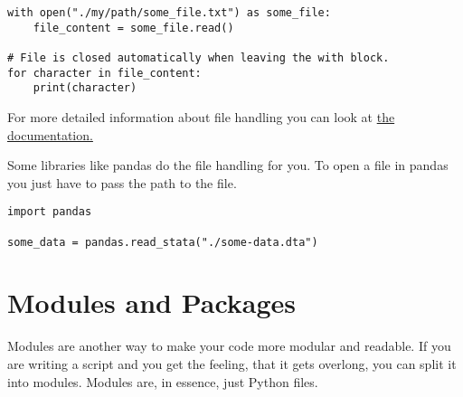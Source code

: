 \documentclass{article}
\begin{document}
\begin{lstlisting}
with open("./my/path/some_file.txt") as some_file:
    file_content = some_file.read()

# File is closed automatically when leaving the with block.
for character in file_content:
    print(character)
\end{lstlisting}

For more detailed information about file handling you can look at
\href{https://realpython.com/read-write-files-python/}{the documentation.}

Some libraries like pandas do the file handling for you.
To open a file in pandas you just have to pass the path to the file.

\begin{lstlisting}
import pandas

some_data = pandas.read_stata("./some-data.dta")

\end{lstlisting}


\section{Modules and Packages}

Modules are another way to make your code more modular and readable.
If you are writing a script and you get the feeling, that it gets overlong,
you can split it into modules.
Modules are, in essence, just Python files.
\end{document}
